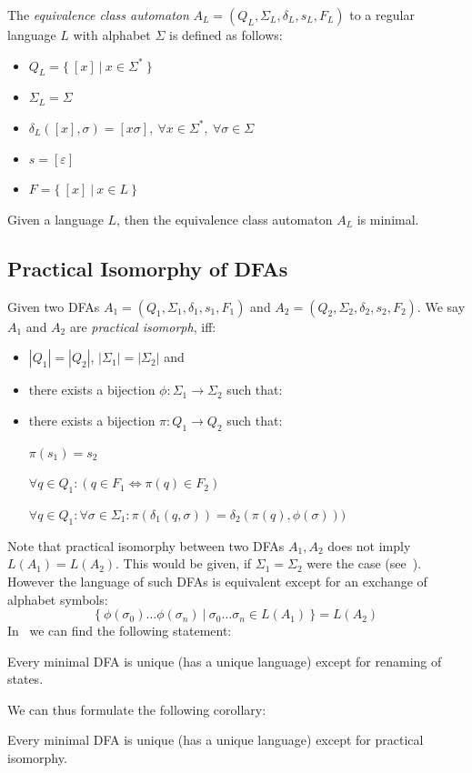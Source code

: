 The \emph{equivalence class automaton} $A_L = (Q_L, \Sigma_L, \delta_L, s_L, F_L)$ to a regular language $L$ with alphabet $\Sigma$ is defined as follows:
\begin{itemize}
	\item $Q_L = \{\ [x]\ |\ x \in \Sigma^*\ \}$
	\item $\Sigma_L = \Sigma$
	\item $\delta_L([x], \sigma) = [x\sigma],\ \forall x\in\Sigma^*,\ \forall\sigma\in\Sigma$
	\item $s = [\varepsilon]$
	\item $F = \{\ [x]\ |\ x \in L\ \}$
\end{itemize}
\begin{theorem}
	Given a language $L$, then the equivalence class automaton $A_L$ is minimal.
\end{theorem}

\subsection{Practical Isomorphy of DFAs}

Given two DFAs $A_1 = (Q_1, \Sigma_1, \delta_1, s_1, F_1)$ and $A_2 = (Q_2, \Sigma_2, \delta_2, s_2, F_2)$. We say $A_1$ and $A_2$ are \emph{practical isomorph}, iff:
\begin{itemize}
	\item $|Q_1| = |Q_2|$, $|\Sigma_1| = |\Sigma_2|$ and
	\item there exists a bijection $\phi\colon \Sigma_1 \to \Sigma_2$ such that:
	\item there exists a bijection $\pi\colon Q_1 \to Q_2$ such that:
	
	$\pi(s_1) = s_2$
	
	$\forall q\in Q_1\colon (q\in F_1 \Longleftrightarrow \pi(q)\in F_2)$
	
	$\forall q\in Q_1\colon \forall\sigma\in\Sigma_1\colon \pi(\delta_1(q,\sigma))=\delta_2(\pi(q),\phi(\sigma)))$
\end{itemize}
Note that practical isomorphy between two DFAs $A_1, A_2$ does not imply $L(A_1) = L(A_2)$. This would be given, if $\Sigma_1 = \Sigma_2$ were the case (see~\cite[p. 45]{Sch01}). However the language of such DFAs is equivalent except for an exchange of alphabet symbols:
\[
	\{\ \phi(\sigma_0)\ldots\phi(\sigma_n)\ |\ \sigma_0\ldots\sigma_n\in L(A_1)\ \} = L(A_2)
\]
In~\cite[p. 45]{Sch01} we can find the following statement:
\begin{theorem}
	Every minimal DFA is unique (has a unique language) except for renaming of states.
\end{theorem}
We can thus formulate the following corollary:
\begin{corollary}\label{ch:1:ism-uniq-lan}
	Every minimal DFA is unique (has a unique language) except for practical isomorphy.
\end{corollary}

